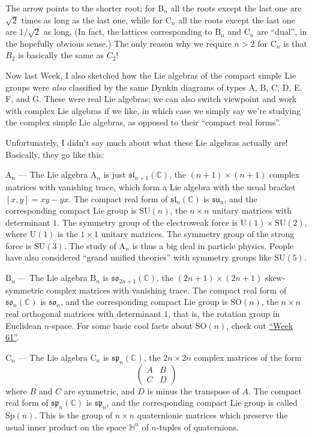 \documentclass{article}
\begin{document}
The arrow points to the shorter root; for \(\mathrm{B}_n\) all the roots
except the last one are \(\sqrt{2}\) times as long as the last one,
while for \(\mathrm{C}_n\) all the roots except the last one are
\(1/\sqrt{2}\) as long. (In fact, the lattices corresponding to
\(\mathrm{B}_n\) and \(\mathrm{C}_n\) are ``dual'', in the hopefully
obvious sense.) The only reason why we require \(n > 2\) for
\(\mathrm{C}_n\) is that \(B_2\) is basically the same as \(C_2\)!

Now last Week, I also sketched how the Lie algebras of the compact
simple Lie groups were \emph{also} classified by the same Dynkin
diagrams of types A, B, C, D, E, F, and G. These were real Lie algebras;
we can also switch viewpoint and work with complex Lie algebras if we
like, in which case we simply say we're studying the complex simple Lie
algebras, as opposed to their ``compact real forms''.

Unfortunately, I didn't say much about what these Lie algebras actually
are! Basically, they go like this:

\(\mathrm{A}_n\) --- The Lie algebra \(\mathrm{A}_n\) is just
\(\mathfrak{sl}_{n+1}(\mathbb{C})\), the \((n+1) \times (n+1)\) complex
matrices with vanishing trace, which form a Lie algebra with the usual
bracket \([x,y] = xy -yx\). The compact real form of
\(\mathfrak{sl}_n(\mathbb{C})\) is \(\mathfrak{su}_n\), and the
corresponding compact Lie group is \(\mathrm{SU}(n)\), the \(n\times n\)
unitary matrices with determinant \(1\). The symmetry group of the
electroweak force is \(\mathrm{U}(1) \times \mathrm{SU}(2)\), where
\(\mathrm{U}(1)\) is the \(1 \times 1\) unitary matrices. The symmetry
group of the strong force is \(\mathrm{SU}(3)\). The study of
\(\mathrm{A}_n\) is thus a big deal in particle physics. People have
also considered ``grand unified theories'' with symmetry groups like
\(\mathrm{SU}(5)\).

\(\mathrm{B}_n\) --- The Lie algebra \(\mathrm{B}_n\) is
\(\mathfrak{so}_{2n+1}(\mathbb{C})\), the \((2n+1) \times (2n+1)\)
skew-symmetric complex matrices with vanishing trace. The compact real
form of \(\mathfrak{so}_n(\mathbb{C})\) is \(\mathfrak{so}_n\), and the
corresponding compact Lie group is \(\mathrm{SO}(n)\), the
\(n \times n\) real orthogonal matrices with determinant \(1\), that is,
the rotation group in Euclidean \(n\)-space. For some basic cool facts
about \(\mathrm{SO}(n)\), check out \protect\hyperlink{week61}{``Week
61''}.

\(\mathrm{C}_n\) --- The Lie algebra \(\mathrm{C}_n\) is
\(\mathfrak{sp}_n(\mathbb{C})\), the \(2n \times 2n\) complex matrices
of the form \[
  \left(
    \begin{array}{cc}
      A&B\\C&D
    \end{array}
  \right)
\] where \(B\) and \(C\) are symmetric, and \(D\) is minus the transpose
of \(A\). The compact real form of \(\mathfrak{sp}_n(\mathbb{C})\) is
\(\mathfrak{sp}_n\), and the corresponding compact Lie group is called
\(\mathrm{Sp}(n)\). This is the group of \(n \times n\) quaternionic
matrices which preserve the usual inner product on the space
\(\mathbb{H}^n\) of \(n\)-tuples of quaternions.
\end{document}
